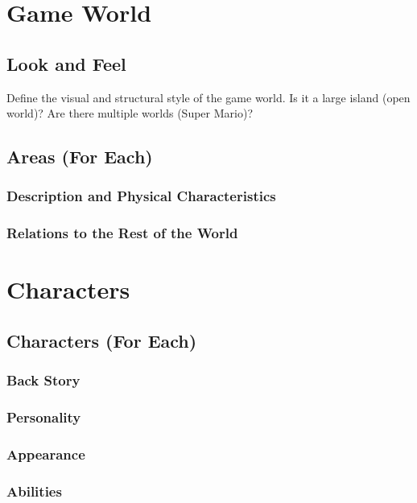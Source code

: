 \documentclass[12pt]{article}
\begin{document}
\section{Game World}

\subsection{Look and Feel}

Define the visual and structural style of the game world. Is it a large island (open world)? Are there multiple worlds (Super Mario)?

\subsection{Areas (For Each)}

\subsubsection{Description and Physical Characteristics}

\subsubsection{Relations to the Rest of the World}

\section{Characters}

\subsection{Characters (For Each)}

\subsubsection{Back Story}

\subsubsection{Personality}

\subsubsection{Appearance}

\subsubsection{Abilities}
\end{document}
